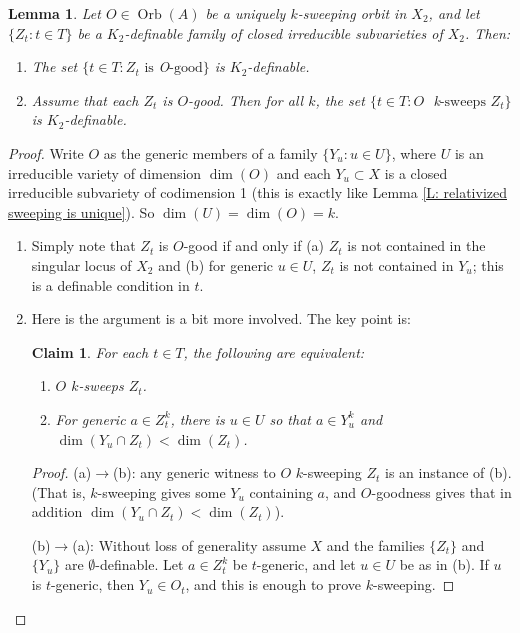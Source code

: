 \documentclass{amsart}
\newtheorem{lemma}[theorem]{Lemma}
\newtheorem{claim}[theorem]{Claim}
\theoremstyle{definition}
\begin{document}
\begin{lemma}\label{L: definability of sweeping}
    Let $O\in\operatorname{Orb}(A)$ be a uniquely $k$-sweeping orbit in $X_2$, and let $\{Z_t:t\in T\}$ be a $K_2$-definable family of closed irreducible subvarieties of $X_2$. Then:
    
    \begin{enumerate}
        \item The set $\{t\in T:Z_t\textrm{ is }$O$\textrm{-good}\}$ is $K_2$-definable.
        \item Assume that each $Z_t$ is $O$-good. Then for all $k$, the set $\{t\in T:O\textrm{ }$k$\textrm{-sweeps }Z_t\}$ is $K_2$-definable.
    \end{enumerate}
\end{lemma}
\begin{proof}
    Write $O$ as the generic members of a family $\{Y_u:u\in U\}$, where $U$ is an irreducible variety of dimension $\dim(O)$ and each $Y_u\subset X$ is a closed irreducible subvariety of codimension 1 (this is exactly like Lemma \ref{L: relativized sweeping is unique}). So $\dim(U)=\dim(O)=k$.
    
    \begin{enumerate}
        \item Simply note that $Z_t$ is $O$-good if and only if (a) $Z_t$ is not contained in the singular locus of $X_2$ and (b) for generic $u\in U$, $Z_t$ is not contained in $Y_u$; this is a definable condition in $t$.

        \item Here is the argument is a bit more involved. The key point is:
        \begin{claim}
            For each $t\in T$, the following are equivalent:
            \begin{enumerate}
                \item[(a)] $O$ $k$-sweeps $Z_t$. 
                \item[(b)] For generic $a\in Z_t^k$, there is $u\in U$ so that $a\in Y_u^k$ and $\dim(Y_u\cap Z_t)<\dim(Z_t)$.
            \end{enumerate}
        \end{claim}
        \begin{proof}
        (a)$\rightarrow$(b): any generic witness to $O$ $k$-sweeping $Z_t$ is an instance of (b). (That is, $k$-sweeping gives some $Y_u$ containing $a$, and $O$-goodness gives that in addition $\dim(Y_u\cap Z_t)<\dim(Z_t)$).

        (b)$\rightarrow$(a): Without loss of generality assume $X$ and the families $\{Z_t\}$ and $\{Y_u\}$ are $\emptyset$-definable. Let $a\in Z_t^k$ be $t$-generic, and let $u\in U$ be as in (b). If $u$ is $t$-generic, then $Y_u\in O_t$, and this is enough to prove $k$-sweeping.


\end{proof}
\end{enumerate}
\end{proof}
\end{document}
